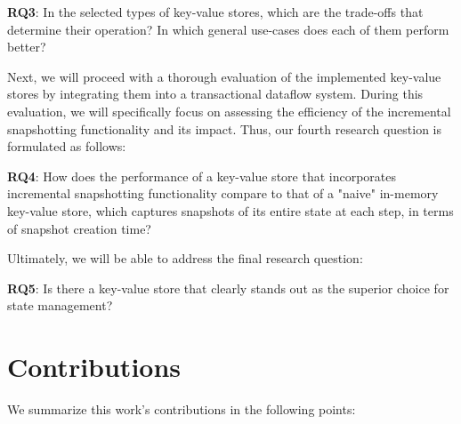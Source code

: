 \begin{tcolorbox}
    \textbf{RQ3}: In the selected types of key-value stores, which are the trade-offs that determine their operation? In which general use-cases does each of them perform better?
\end{tcolorbox}
\vspace{8px}

Next, we will proceed with a thorough evaluation of the implemented key-value stores by integrating them into a transactional dataflow system. During this evaluation, we will specifically focus on assessing the efficiency of the incremental snapshotting functionality and its impact. Thus, our fourth research question is formulated as follows:\\

\begin{tcolorbox}
    \textbf{RQ4}: How does the performance of a key-value store that incorporates incremental snapshotting functionality compare to that of a "naive" in-memory key-value store, which captures snapshots of its entire state at each step, in terms of snapshot creation time?
\end{tcolorbox}
\vspace{8px}

Ultimately, we will be able to address the final research question:\\

\begin{tcolorbox}
    \textbf{RQ5}: Is there a key-value store that clearly stands out as the superior choice for state management?
\end{tcolorbox}
\vspace{8px}

\section{Contributions}

We summarize this work's contributions in the following points:

